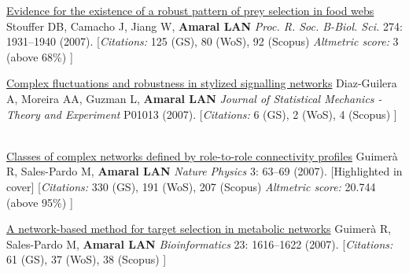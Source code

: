 \NumberedItem{\makebox[0.8cm][r]{[70]}}
\href{/people/amaral/evidence-for-the-existence-of-a-robust-pattern-of-prey-selection-in-food-webs}
{Evidence for the existence of a robust pattern of prey selection in food webs}
\newline
Stouffer DB, Camacho J, Jiang W, {\textbf{Amaral LAN}}
\newline
\textit{Proc. R. Soc. B-Biol. Sci.}
    274:
1931--1940 (2007).
    \newline
    \hfill [{\em{Citations:}} 125 (GS),
    80 (WoS), 92 (Scopus)
        {\hspace*{1cm} \em{Altmetric score:}}  3 (above 68\%)
    ]
\newline
\Gap
~
\Gap

\NumberedItem{\makebox[0.8cm][r]{[69]}}
\href{/people/amaral/complex-fluctuations-and-robustness-in-stylized-signalling-networks}
{Complex fluctuations and robustness in stylized signalling networks}
\newline
Diaz-Guilera A, Moreira AA, Guzman L, {\textbf{Amaral LAN}}
\newline
\textit{Journal of Statistical Mechanics - Theory and Experiment}
P01013 (2007).
    \newline
    \hfill [{\em{Citations:}} 6 (GS),
    2 (WoS), 4 (Scopus)
    ]
\newline
\Gap
~
\Gap

\NumberedItem{\makebox[0.8cm][r]{[68]}}
\href{/people/amaral/classes-of-complex-networks-defined-by-role-to-role-connectivity-profiles}
{Classes of complex networks defined by role-to-role connectivity profiles}
\newline
Guimer\`a R, Sales-Pardo M, {\textbf{Amaral LAN}}
\newline
\textit{Nature Physics}
    3:
63--69 (2007).
    [Highlighted in cover]
    \newline
    \hfill [{\em{Citations:}} 330 (GS),
    191 (WoS), 207 (Scopus)
        {\hspace*{1cm} \em{Altmetric score:}}  20.744 (above 95\%)
    ]
\newline
\Gap
~
\Gap

\NumberedItem{\makebox[0.8cm][r]{[67]}}
\href{/people/amaral/a-network-based-method-for-target-selection-in-metabolic-networks}
{A network-based method for target selection in metabolic networks}
\newline
Guimer\`a R, Sales-Pardo M, {\textbf{Amaral LAN}}
\newline
\textit{Bioinformatics}
    23:
1616--1622 (2007).
    \newline
    \hfill [{\em{Citations:}} 61 (GS),
    37 (WoS), 38 (Scopus)
    ]
\newline
\Gap
~
\Gap


